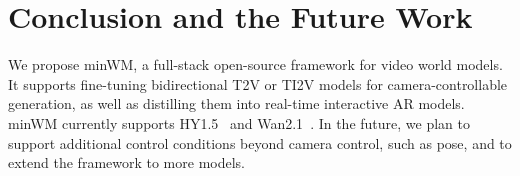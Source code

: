 \section{Conclusion and the Future Work}
We propose minWM, a full-stack open-source framework for video world models. It supports fine-tuning bidirectional T2V or TI2V models for camera-controllable generation, as well as distilling them into real-time interactive AR models. minWM currently supports HY1.5~\cite{kong2024hunyuanvideo} and Wan2.1~\cite{wan2025wan}. In the future, we plan to support additional control conditions beyond camera control, such as pose, and to extend the framework to more models.